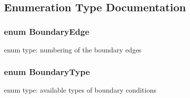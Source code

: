\subsection{Enumeration Type Documentation}
\hypertarget{SWE__Scenario_8hh_aa5e01e3f7df312f7b9b0d02521141fcc}{
\subsubsection[{Boundary\-Edge}]{\setlength{\rightskip}{0pt plus 5cm}enum {\bf Boundary\-Edge}}}\label{SWE__Scenario_8hh_aa5e01e3f7df312f7b9b0d02521141fcc}
enum type\-: numbering of the boundary edges \hypertarget{SWE__Scenario_8hh_af75d5dd7322fa39ed0af4e7839e600f8}{
\subsubsection[{Boundary\-Type}]{\setlength{\rightskip}{0pt plus 5cm}enum {\bf Boundary\-Type}}}\label{SWE__Scenario_8hh_af75d5dd7322fa39ed0af4e7839e600f8}
enum type\-: available types of boundary conditions 